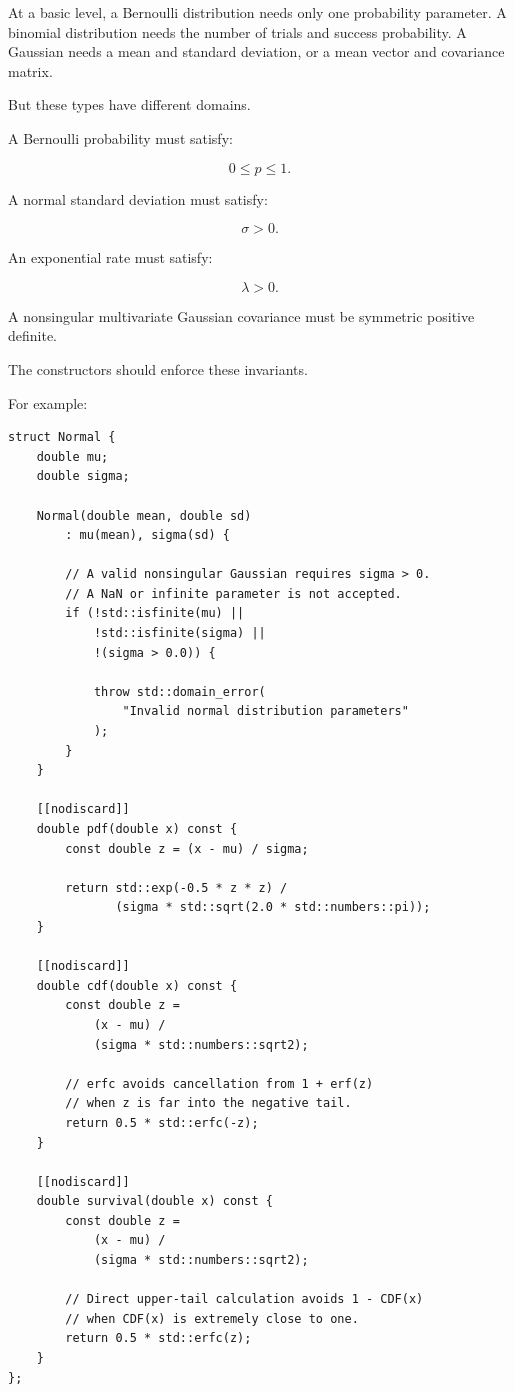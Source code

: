 At a basic level, a Bernoulli distribution needs only one probability parameter. A binomial distribution needs the number of trials and success probability. A Gaussian needs a mean and standard deviation, or a mean vector and covariance matrix.

But these types have different domains.

A Bernoulli probability must satisfy:

\[
 0\le p\le1.
\]

A normal standard deviation must satisfy:

\[
 \sigma>0.
\]

An exponential rate must satisfy:

\[
 \lambda>0.
\]

A nonsingular multivariate Gaussian covariance must be symmetric positive definite.

The constructors should enforce these invariants.

For example:

\begin{verbatim}
struct Normal {
    double mu;
    double sigma;

    Normal(double mean, double sd)
        : mu(mean), sigma(sd) {

        // A valid nonsingular Gaussian requires sigma > 0.
        // A NaN or infinite parameter is not accepted.
        if (!std::isfinite(mu) ||
            !std::isfinite(sigma) ||
            !(sigma > 0.0)) {

            throw std::domain_error(
                "Invalid normal distribution parameters"
            );
        }
    }

    [[nodiscard]]
    double pdf(double x) const {
        const double z = (x - mu) / sigma;

        return std::exp(-0.5 * z * z) /
               (sigma * std::sqrt(2.0 * std::numbers::pi));
    }

    [[nodiscard]]
    double cdf(double x) const {
        const double z =
            (x - mu) /
            (sigma * std::numbers::sqrt2);

        // erfc avoids cancellation from 1 + erf(z)
        // when z is far into the negative tail.
        return 0.5 * std::erfc(-z);
    }

    [[nodiscard]]
    double survival(double x) const {
        const double z =
            (x - mu) /
            (sigma * std::numbers::sqrt2);

        // Direct upper-tail calculation avoids 1 - CDF(x)
        // when CDF(x) is extremely close to one.
        return 0.5 * std::erfc(z);
    }
};
\end{verbatim}

